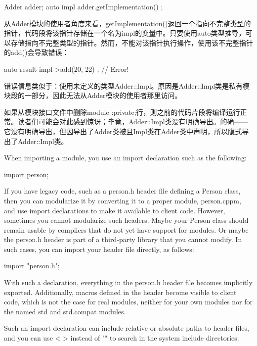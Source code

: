 \begin{cpp}
Adder adder;
auto impl { adder.getImplementation() };
\end{cpp}

从Adder模块的使用者角度来看，getImplementation()返回一个指向不完整类型的指针，代码段将该指针存储在一个名为impl的变量中。只要使用auto类型推导，可以存储指向不完整类型的指针。然而，不能对该指针执行操作，使用该不完整指针的add()会导致错误：

\begin{cpp}
auto result { impl->add(20, 22) }; // Error!
\end{cpp}

错误信息类似于：使用未定义的类型Adder::Impl。原因是Adder::Impl类是私有模块段的一部分，因此无法从Adder模块的使用者那里访问。

如果从模块接口文件中删除module :private;行，则之前的代码片段将编译运行正常。读者们可能会对此感到惊讶；毕竟，Adder::Impl类没有明确导出。的确——它没有明确导出，但因导出了Adder类被且Impl类在Adder类中声明，所以隐式导出了Adder::Impl类。


When importing a module, you use an import declaration such as the following:

\begin{cpp}
import person;
\end{cpp}

If you have legacy code, such as a person.h header file defining a Person class, then you can modularize it by converting it to a proper module, person.cppm, and use import declarations to make it available to client code. However, sometimes you cannot modularize such headers. Maybe your Person class should remain usable by compilers that do not yet have support for modules. Or maybe the person.h header is part of a third-party library that you cannot modify. In such cases, you can import your header file directly, as follows:

\begin{cpp}
import "person.h";
\end{cpp}

With such a declaration, everything in the person.h header file becomes implicitly exported. Additionally, macros defined in the header become visible to client code, which is not the case for real modules, neither for your own modules nor for the named std and std.compat modules.

Such an import declaration can include relative or absolute paths to header files, and you can use < > instead of "" to search in the system include directories:

